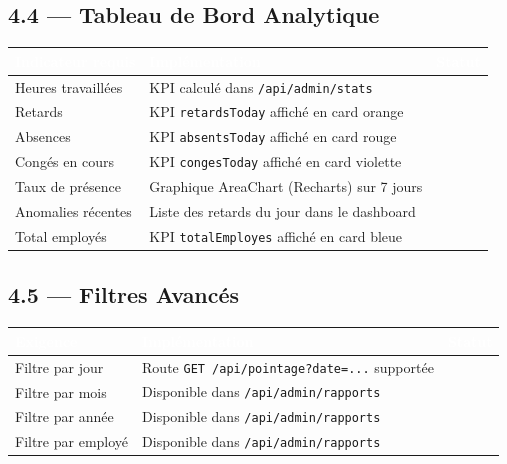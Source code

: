 \documentclass[12pt,a4paper]{article}
\newcommand{\cmark}{\textcolor{vert}{\ding{51}}}
\begin{document}
\subsection{4.4 — Tableau de Bord Analytique}

\begin{longtable}{p{5.5cm} p{5.5cm} c}
\toprule
\rowcolor{headerblue}
\textcolor{white}{\textbf{Indicateur requis}} & \textcolor{white}{\textbf{Implémentation}} & \textcolor{white}{\textbf{Statut}} \\
\midrule
\endhead
Heures travaillées & KPI calculé dans \texttt{/api/admin/stats} & \cmark \\
\midrule
Retards & KPI \texttt{retardsToday} affiché en card orange & \cmark \\
\midrule
Absences & KPI \texttt{absentsToday} affiché en card rouge & \cmark \\
\midrule
Congés en cours & KPI \texttt{congesToday} affiché en card violette & \cmark \\
\midrule
Taux de présence & Graphique AreaChart (Recharts) sur 7 jours & \cmark \\
\midrule
Anomalies récentes & Liste des retards du jour dans le dashboard & \cmark \\
\midrule
Total employés & KPI \texttt{totalEmployes} affiché en card bleue & \cmark \\
\bottomrule
\end{longtable}

\subsection{4.5 — Filtres Avancés}

\begin{longtable}{p{5.5cm} p{5.5cm} c}
\toprule
\rowcolor{headerblue}
\textcolor{white}{\textbf{Exigence}} & \textcolor{white}{\textbf{Implémentation}} & \textcolor{white}{\textbf{Statut}} \\
\midrule
\endhead
Filtre par jour & Route \texttt{GET /api/pointage?date=...} supportée & \cmark \\
\midrule
Filtre par mois & Disponible dans \texttt{/api/admin/rapports} & \cmark \\
\midrule
Filtre par année & Disponible dans \texttt{/api/admin/rapports} & \cmark \\
\midrule
Filtre par employé & Disponible dans \texttt{/api/admin/rapports} & \cmark \\
\bottomrule
\end{longtable}
\end{document}
